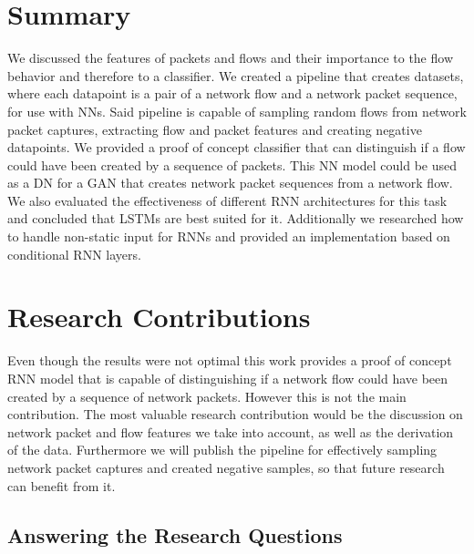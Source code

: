 \documentclass[
	ngerman,
	ruledheaders=section,%
	class=report,%
	thesis={type=bachelor},%
	accentcolor=9c,%
	custommargins=true,%
	marginpar=false,%
	parskip=half-,%
	fontsize=11pt,%
]{tudapub}
\begin{document}

\section{Summary}
\label{sec:summary}

We discussed the features of packets and flows and their importance to the flow behavior and therefore to a classifier.
We created a pipeline that creates datasets, where each datapoint is a pair of a network flow and a network packet sequence, for use with NNs.
Said pipeline is capable of sampling random flows from network packet captures, extracting flow and packet features and creating negative datapoints.
We provided a proof of concept classifier that can distinguish if a flow could have been created by a sequence of packets.
This NN model could be used as a DN for a GAN that creates network packet sequences from a network flow.
We also evaluated the effectiveness of different RNN architectures for this task
and concluded that LSTMs are best suited for it.
Additionally we researched how to handle non-static input for RNNs and provided an implementation based on conditional RNN layers.

\section{Research Contributions}
\label{sec:Contributions}

Even though the results were not optimal this work provides a proof of concept RNN model that is capable of distinguishing if a network flow could have been created by a sequence of network packets.
However this is not the main contribution.
The most valuable research contribution would be the discussion on network packet and flow features we take into account, as well as the derivation of the data.
Furthermore we will publish the pipeline for effectively sampling network packet captures and created negative samples, so that future research can benefit from it.

\subsection{Answering the Research Questions}
\label{sec:answers}
\end{document}
